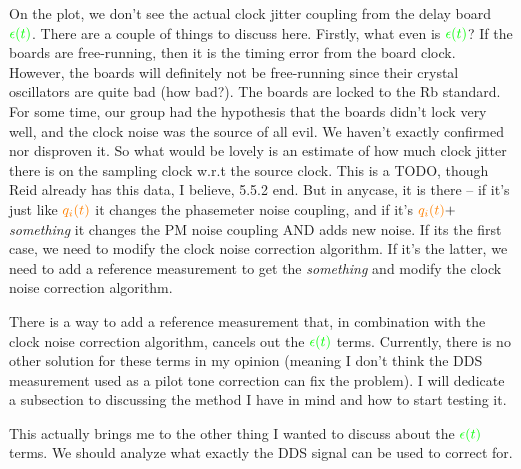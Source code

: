 \documentclass[11pt]{article}
\begin{document}
On the plot, we don't see the actual clock jitter coupling from the delay board ${\color{green}\epsilon(t)}$. There are a couple of things to discuss here. Firstly, what even is ${\color{green}\epsilon(t)}$? If the boards are free-running, then it is the timing error from the board clock. However, the boards will definitely not be free-running since their crystal oscillators are quite bad (how bad?). The boards are locked to the Rb standard. For some time, our group had the hypothesis that the boards didn't lock very well, and the clock noise was the source of all evil. We haven't exactly confirmed nor disproven it. So what would be lovely is an estimate of how much clock jitter there is on the sampling clock w.r.t the source clock. {\color{red}This is a TODO, though Reid already has this data, I believe, 5.5.2 end.} But in anycase, it is there -- if it's just like ${\color{orange}q_{i}(t)}$ it changes the phasemeter noise coupling, and if it's ${\color{orange}q_{i}(t)} +$ \textit{something} it changes the PM noise coupling AND adds new noise. If its the first case, we need to modify the clock noise correction algorithm. If it's the latter, we need to add a reference measurement to get the \textit{something} and modify the clock noise correction algorithm. 

There is a way to add a reference measurement that, in combination with the clock noise correction algorithm, cancels out the ${\color{green}\epsilon(t)}$ terms. Currently, there is no other solution for these terms in my opinion (meaning I don't think the DDS measurement used as a pilot tone correction can fix the problem). I will dedicate a subsection to discussing the method I have in mind and how to start testing it. 

This actually brings me to the other thing I wanted to discuss about the ${\color{green}\epsilon(t)}$ terms. We should analyze what exactly the DDS signal can be used to correct for. 
\end{document}
